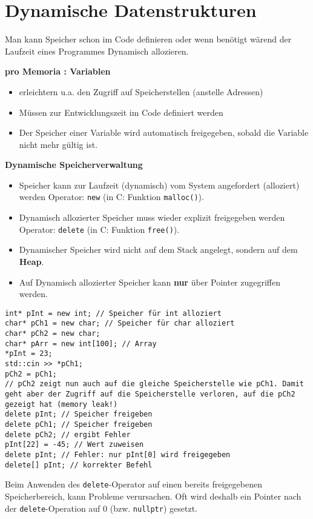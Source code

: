 \section{Dynamische Datenstrukturen}
Man kann Speicher schon im Code definieren oder wenn benötigt wärend der Laufzeit eines Programmes Dynamisch allozieren.

\textbf{pro Memoria : Variablen}

\begin{itemize}
	\item erleichtern u.a. den Zugriff auf Speicherstellen (anstelle Adressen)  
	\item Müssen zur Entwicklungszeit im Code definiert werden
	\item Der Speicher einer Variable wird automatisch freigegeben, sobald die Variable nicht mehr gültig ist.
	
\end{itemize}

\textbf{Dynamische Speicherverwaltung}
\begin{itemize}
	\item Speicher kann zur Laufzeit (dynamisch) vom System angefordert (alloziert) werden 
	\subitem Operator: \texttt{new} (in C: Funktion \texttt{malloc()}).
	\item Dynamisch allozierter Speicher muss wieder explizit freigegeben werden
	\subitem Operator: \texttt{delete} (in C: Funktion \texttt{free()}).
	\item Dynamischer Speicher wird nicht auf dem Stack angelegt, sondern auf dem \textbf{Heap}.
	\item Auf Dynamisch allozierter Speicher kann \textbf{nur} über Pointer zugegriffen werden.
\end{itemize}

\begin{lstlisting}[mathescape]
int* pInt = new int; // Speicher für int alloziert
char* pCh1 = new char; // Speicher für char alloziert
char* pCh2 = new char;
char* pArr = new int[100]; // Array
*pInt = 23;
std::cin >> *pCh1;
pCh2 = pCh1;
// pCh2 zeigt nun auch auf die gleiche Speicherstelle wie pCh1. Damit geht aber der Zugriff auf die Speicherstelle verloren, auf die pCh2 gezeigt hat (memory leak!)
delete pInt; // Speicher freigeben
delete pCh1; // Speicher freigeben
delete pCh2; // ergibt Fehler
pInt[22] = -45; // Wert zuweisen
delete pInt; // Fehler: nur pInt[0] wird freigegeben
delete[] pInt; // korrekter Befehl
\end{lstlisting}
Beim Anwenden des \texttt{delete}-Operator auf einen bereits freigegebenen Speicherbereich, kann Probleme verursachen. Oft wird deshalb ein Pointer nach der \texttt{delete}-Operation auf 0 (bzw. \texttt{nullptr}) gesetzt.


















